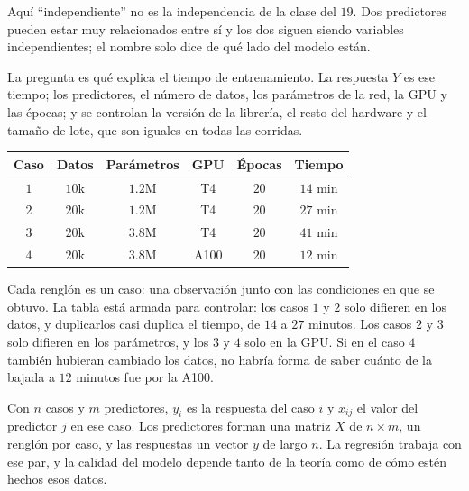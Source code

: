 \documentclass[11pt,letterpaper]{article}
\begin{document}
Aquí ``independiente'' no es la independencia de la clase del $19$.
Dos predictores pueden estar muy relacionados entre sí y los dos siguen
siendo variables independientes; el nombre solo dice de qué lado del
modelo están.

\begin{ejemplo}
    La pregunta es qué explica el tiempo de entrenamiento. La respuesta
    $Y$ es ese tiempo; los predictores, el número de datos, los
    parámetros de la red, la GPU y las épocas; y se controlan la
    versión de la librería, el resto del hardware y el tamaño de lote,
    que son iguales en todas las corridas.
    \begin{center}
    \small
    \begin{tabular}{cccccc}
        \toprule
        \textbf{Caso} & \textbf{Datos} & \textbf{Parámetros}
        & \textbf{GPU} & \textbf{Épocas} & \textbf{Tiempo} \\
        \midrule
        $1$ & $10$k & $1.2$M & T4   & $20$ & $14$ min \\
        $2$ & $20$k & $1.2$M & T4   & $20$ & $27$ min \\
        $3$ & $20$k & $3.8$M & T4   & $20$ & $41$ min \\
        $4$ & $20$k & $3.8$M & A100 & $20$ & $12$ min \\
        \bottomrule
    \end{tabular}
    \end{center}
    Cada renglón es un caso: una observación junto con las condiciones
    en que se obtuvo. La tabla está armada para controlar: los casos
    $1$ y $2$ solo difieren en los datos, y duplicarlos casi duplica el
    tiempo, de $14$ a $27$ minutos. Los casos $2$ y $3$ solo difieren
    en los parámetros, y los $3$ y $4$ solo en la GPU. Si en el caso
    $4$ también hubieran cambiado los datos, no habría forma de saber
    cuánto de la bajada a $12$ minutos fue por la A100.
\end{ejemplo}

Con $n$ casos y $m$ predictores, $y_i$ es la respuesta del caso $i$ y
$x_{ij}$ el valor del predictor $j$ en ese caso. Los predictores forman
una matriz $X$ de $n \times m$, un renglón por caso, y las respuestas un
vector $y$ de largo $n$. La regresión trabaja con ese par, y la calidad
del modelo depende tanto de la teoría como de cómo estén hechos esos
datos.

\end{document}
